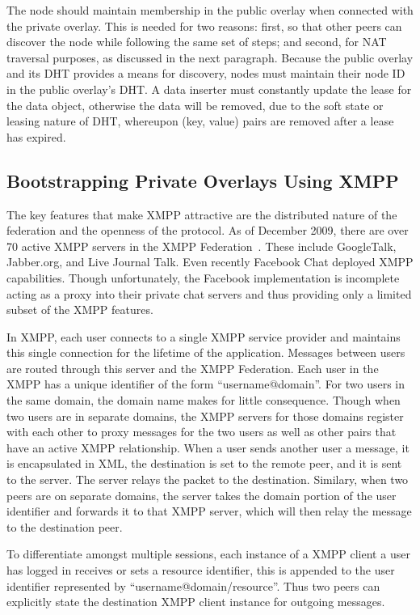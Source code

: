 \documentclass[conference]{IEEEtran}
\begin{document}
The node should maintain membership in the public overlay when connected with
the private overlay.  This is needed for two reasons: first, so that other
peers can discover the node while following the same set of steps; and second,
for NAT traversal purposes, as discussed in the next paragraph.  Because the
public overlay and its DHT provides a means for discovery, nodes must maintain
their node ID in the public overlay's DHT.  A data inserter must constantly
update the lease for the data object, otherwise the data will be removed, due
to the soft state or leasing nature of DHT, whereupon (key, value) pairs are
removed after a lease has expired.

\subsection{Bootstrapping Private Overlays Using XMPP}
\label{xmpp_bootstrapping}

The key features that make XMPP attractive are the distributed nature of the
federation and the openness of the protocol.  As of December 2009, there are
over 70 active XMPP servers in the XMPP Federation~\cite{xmpp_servers}.  These
include GoogleTalk, Jabber.org, and Live Journal Talk.  Even recently Facebook
Chat deployed XMPP capabilities.  Though unfortunately, the Facebook
implementation is incomplete acting as a proxy into their private chat servers
and thus providing only a limited subset of the XMPP features.

In XMPP, each user connects to a single XMPP service provider and maintains
this single connection for the lifetime of the application.  Messages between
users are routed through this server and the XMPP Federation.  Each user in the
XMPP has a unique identifier of the form ``username@domain''.  For two users in
the same domain, the domain name makes for little consequence.  Though when two
users are in separate domains, the XMPP servers for those domains register with
each other to proxy messages for the two users as well as other pairs that have
an active XMPP relationship.  When a user sends another user a message, it is
encapsulated in XML, the destination is set to the remote peer, and it is sent
to the server.  The server relays the packet to the destination.  Similary,
when two peers are on separate domains, the server takes the domain portion of
the user identifier and forwards it to that XMPP server, which will then relay
the message to the destination peer.

To differentiate amongst multiple sessions, each instance of a XMPP client a
user has logged in receives or sets a resource identifier, this is appended to
the user identifier represented by ``username@domain/resource''.  Thus two peers
can explicitly state the destination XMPP client instance for outgoing
messages.
\end{document}
